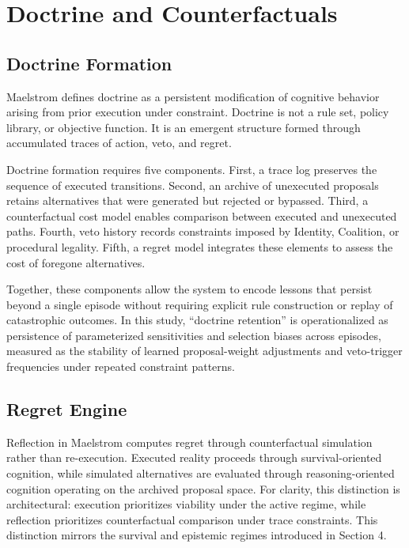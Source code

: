 \documentclass[11pt,a4paper]{article}
\begin{document}
\section{Doctrine and Counterfactuals}

\subsection{Doctrine Formation}

Maelstrom defines doctrine as a persistent modification of cognitive behavior arising from prior execution under constraint. Doctrine is not a rule set, policy library, or objective function. It is an emergent structure formed through accumulated traces of action, veto, and regret.

Doctrine formation requires five components. First, a trace log preserves the sequence of executed transitions. Second, an archive of unexecuted proposals retains alternatives that were generated but rejected or bypassed. Third, a counterfactual cost model enables comparison between executed and unexecuted paths. Fourth, veto history records constraints imposed by Identity, Coalition, or procedural legality. Fifth, a regret model integrates these elements to assess the cost of foregone alternatives.

Together, these components allow the system to encode lessons that persist beyond a single episode without requiring explicit rule construction or replay of catastrophic outcomes. In this study, ``doctrine retention'' is operationalized as persistence of parameterized sensitivities and selection biases across episodes, measured as the stability of learned proposal-weight adjustments and veto-trigger frequencies under repeated constraint patterns.

\subsection{Regret Engine}

Reflection in Maelstrom computes regret through counterfactual simulation rather than re-execution. Executed reality proceeds through survival-oriented cognition, while simulated alternatives are evaluated through reasoning-oriented cognition operating on the archived proposal space. For clarity, this distinction is architectural: execution prioritizes viability under the active regime, while reflection prioritizes counterfactual comparison under trace constraints. This distinction mirrors the survival and epistemic regimes introduced in Section 4.
\end{document}
